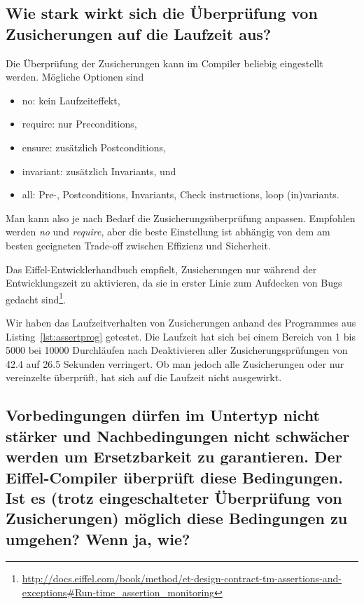 \documentclass[a4paper,10pt]{article}
\begin{document}

\subsection{Wie stark wirkt sich die Überprüfung von Zusicherungen auf die Laufzeit aus?}

Die \"Uberpr\"ufung der Zusicherungen kann im Compiler beliebig eingestellt werden. M\"ogliche Optionen sind

\begin{itemize}
\item no: kein Laufzeiteffekt,
\item require: nur Preconditions,
\item ensure: zus\"atzlich Postconditions,
\item invariant: zus\"atzlich Invariants, und
\item all: Pre-, Postconditions, Invariants, Check instructions, loop (in)variants.
\end{itemize}

Man kann also je nach Bedarf die Zusicherungs\"uberpr\"ufung anpassen. Empfohlen werden
\emph{no} und \emph{require}, aber die beste Einstellung ist abh\"angig von dem am besten
geeigneten Trade-off zwischen Effizienz und Sicherheit.

Das Eiffel-Entwicklerhandbuch empfielt, Zusicherungen nur während der Entwicklungszeit zu aktivieren, da sie in erster Linie zum Aufdecken von Bugs gedacht sind\footnote{\url{http://docs.eiffel.com/book/method/et-design-contract-tm-assertions-and-exceptions#Run-time_assertion_monitoring}}. 

Wir haben das Laufzeitverhalten von Zusicherungen anhand des Programmes aus Listing~\ref{lst:assertprog} getestet. Die Laufzeit hat sich bei einem Bereich von 1 bis 5000 bei 10000 Durchläufen nach Deaktivieren aller Zusicherungsprüfungen von 42.4 auf 26.5 Sekunden verringert. Ob man jedoch alle Zusicherungen oder nur vereinzelte überprüft, hat sich auf die Laufzeit nicht ausgewirkt.


\subsection{Vorbedingungen dürfen im Untertyp nicht stärker und Nachbedingungen nicht 
schwächer werden um Ersetzbarkeit zu garantieren. Der Eiffel-Compiler überprüft 
diese Bedingungen. Ist es (trotz eingeschalteter Überprüfung von Zusicherungen) 
möglich diese Bedingungen zu umgehen? Wenn ja, wie?}
\end{document}
